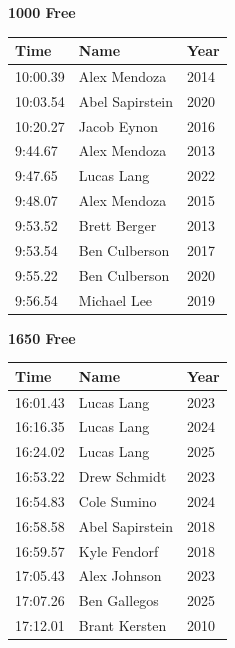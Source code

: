 \vspace{1.2em}
\noindent\begin{minipage}[t]{0.48\textwidth}
\centering
\textbf{\textcolor{teamprimary}{1000 Free}}\par
\vspace{0.5em}
\centering
\small
\renewcommand{\arraystretch}{1.0}
\setlength{\tabcolsep}{4pt}
\begin{tabular}{@{}p{1.8cm}p{3.0cm}p{1.0cm}@{}}
\toprule
\textbf{Time} & \textbf{Name} & \textbf{Year} \\
\midrule
10:00.39 & Alex Mendoza & 2014 \\
10:03.54 & Abel Sapirstein & 2020 \\
10:20.27 & Jacob Eynon & 2016 \\
9:44.67 & Alex Mendoza & 2013 \\
9:47.65 & Lucas Lang & 2022 \\
9:48.07 & Alex Mendoza & 2015 \\
9:53.52 & Brett Berger & 2013 \\
9:53.54 & Ben Culberson & 2017 \\
9:55.22 & Ben Culberson & 2020 \\
9:56.54 & Michael Lee & 2019 \\
\bottomrule
\end{tabular}
\end{minipage}
\hfill
\begin{minipage}[t]{0.48\textwidth}
\centering
\textbf{\textcolor{teamprimary}{1650 Free}}\par
\vspace{0.5em}
\centering
\small
\renewcommand{\arraystretch}{1.0}
\setlength{\tabcolsep}{4pt}
\begin{tabular}{@{}p{1.8cm}p{3.0cm}p{1.0cm}@{}}
\toprule
\textbf{Time} & \textbf{Name} & \textbf{Year} \\
\midrule
16:01.43 & Lucas Lang & 2023 \\
16:16.35 & Lucas Lang & 2024 \\
16:24.02 & Lucas Lang & 2025 \\
16:53.22 & Drew Schmidt & 2023 \\
16:54.83 & Cole Sumino & 2024 \\
16:58.58 & Abel Sapirstein & 2018 \\
16:59.57 & Kyle Fendorf & 2018 \\
17:05.43 & Alex Johnson & 2023 \\
17:07.26 & Ben Gallegos & 2025 \\
17:12.01 & Brant Kersten & 2010 \\
\bottomrule
\end{tabular}
\end{minipage}
